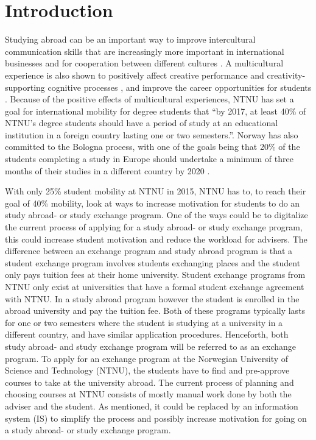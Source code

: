 
\chapter{Introduction}
Studying abroad can be an important way to improve intercultural communication skills that are increasingly more important in international businesses and for cooperation between different cultures \cite{williams2005exploring}. A multicultural experience is also shown to positively affect creative performance and creativity-supporting
cognitive processes \cite{leung2008multicultural}, and improve the career opportunities for students \cite{brandenburg2014erasmus}. Because of the positive effects of multicultural experiences, NTNU has set a goal for international mobility for degree students that \enquote{by 2017, at least 40\% of NTNU's degree students should have a period of study at an educational institution in a foreign country lasting one or two semesters.}\cite{internasjonal_plan}. Norway has also committed to the Bologna process, with one of the goals being that 20\% of the students completing a study in Europe should undertake a minimum of three months of their studies in a different country by 2020 \cite{2020_Bologna}.

With only 25\% student mobility at NTNU in 2015\cite{studentutveksling_andel}, NTNU has to, to reach their goal of 40\% mobility, look at ways to increase motivation for students to do an study abroad- or study exchange program. One of the ways could be to digitalize the current process of applying for a study abroad- or study exchange program, this could increase student motivation and reduce the workload for advisers. The difference between an exchange program and study abroad program is that a student exchange program involves students exchanging places and the student only pays tuition fees at their home university. Student exchange programs from NTNU only exist at universities that have a formal student exchange agreement with NTNU. In a study abroad program however the student is enrolled in the abroad university and pay the tuition fee. Both of these programs typically lasts for one or two semesters where the student is studying at a university in a different country, and have similar application procedures. Henceforth, both study abroad- and study exchange program will be referred to as an exchange program. To apply for an exchange program at the Norwegian University of Science and Technology (NTNU), the students have to find and pre-approve courses to take at the university abroad. The current process of planning and choosing courses at NTNU consists of mostly manual work done by both the adviser and the student. As mentioned, it could be replaced by an information system (IS) to simplify the process and possibly increase motivation for going on a study abroad- or study exchange program.

